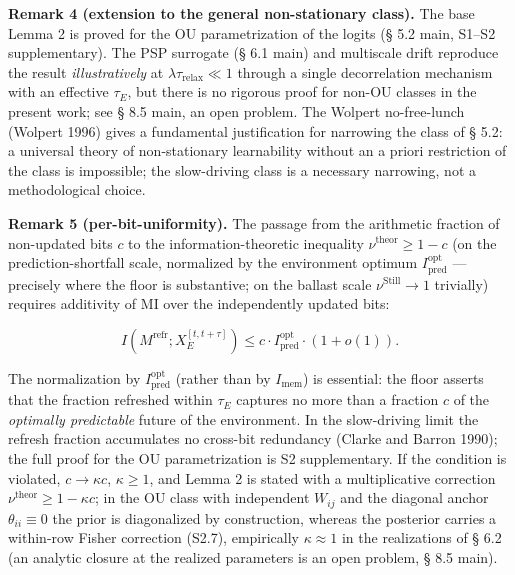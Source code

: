 \documentclass[pdflatex,sn-mathphys-ay]{sn-jnl}
\begin{document}
\textbf{Remark 4 (extension to the general non-stationary class).} The base Lemma 2 is proved for the OU parametrization of the logits (§ 5.2 main, S1--S2 supplementary). The PSP surrogate (§ 6.1 main) and multiscale drift reproduce the result \emph{illustratively} at \(\lambda \tau_{\text{relax}} \ll 1\) through a single decorrelation mechanism with an effective \(\tau_E\), but there is no rigorous proof for non-OU classes in the present work; see § 8.5 main, an open problem. The Wolpert no-free-lunch (Wolpert 1996) gives a fundamental justification for narrowing the class of § 5.2: a universal theory of non-stationary learnability without an a priori restriction of the class is impossible; the slow-driving class is a necessary narrowing, not a methodological choice.



\textbf{Remark 5 (per-bit-uniformity).} The passage from the arithmetic fraction of non-updated bits \(c\) to the information-theoretic inequality \(\nu^{\text{theor}} \ge 1 - c\) (on the prediction-shortfall scale, normalized by the environment optimum \(I_{\text{pred}}^{\text{opt}}\) --- precisely where the floor is substantive; on the ballast scale \(\nu^{\text{Still}} \to 1\) trivially) requires additivity of MI over the independently updated bits:



\[I(M^{\text{refr}}; X_E^{[t,t+\tau]}) \le c \cdot I_{\text{pred}}^{\text{opt}} \cdot (1+o(1)).\]



The normalization by \(I_{\text{pred}}^{\text{opt}}\) (rather than by \(I_{\text{mem}}\)) is essential: the floor asserts that the fraction refreshed within \(\tau_E\) captures no more than a fraction \(c\) of the \emph{optimally predictable} future of the environment. In the slow-driving limit the refresh fraction accumulates no cross-bit redundancy (Clarke and Barron 1990); the full proof for the OU parametrization is S2 supplementary. If the condition is violated, \(c \to \kappa c\), \(\kappa \ge 1\), and Lemma 2 is stated with a multiplicative correction \(\nu^{\text{theor}} \ge 1 - \kappa c\); in the OU class with independent \(W_{ij}\) and the diagonal anchor \(\theta_{ii} \equiv 0\) the prior is diagonalized by construction, whereas the posterior carries a within-row Fisher correction (S2.7), empirically \(\kappa \approx 1\) in the realizations of § 6.2 (an analytic closure at the realized parameters is an open problem, § 8.5 main).
\end{document}
